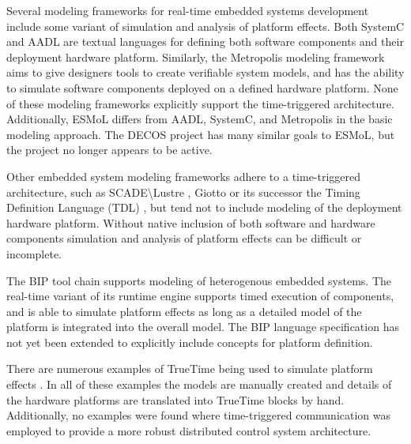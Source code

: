 Several modeling frameworks for real-time embedded systems development include some variant of simulation and analysis of platform effects.  Both SystemC \cite{grotker_02} and AADL \cite{hf_07} are textual languages for defining both software components and their deployment hardware platform.  Similarly, the Metropolis modeling framework \cite{bwhlps_03} aims to give designers tools to create verifiable system models, and has the ability to simulate software components deployed on a defined hardware platform.  None of these modeling frameworks explicitly support the time-triggered architecture.  Additionally, ESMoL differs from AADL, SystemC, and Metropolis in the basic modeling approach\cite{pkvnhhts_08}.  The DECOS project \cite{hsslhbcllss_07} has many similar goals to ESMoL, but the project no longer appears to be active.

Other embedded system modeling frameworks adhere to a time-triggered architecture, such as SCADE\textbackslash Lustre \cite{ccmstn_03}, Giotto \cite{hhk_01} or its successor the Timing Definition Language (TDL) \cite{ffpt_05}, but tend not to include modeling of the deployment hardware platform.  Without native inclusion of both software and hardware components simulation and analysis of platform effects can be difficult or incomplete.

The BIP \cite{basu_08, bbs_06} tool chain supports modeling of heterogenous embedded systems.  The real-time variant of its runtime engine supports timed execution of components, and is able to simulate platform effects as long as a detailed model of the platform is integrated into the overall model.  The BIP language specification \cite{bipUserManual} has not yet been extended to explicitly include concepts for platform definition.

There are numerous examples of TrueTime being used to simulate platform effects \cite{coh_07,vv_05}.  In all of these examples the models are manually created and details of the hardware platforms are translated into TrueTime blocks by hand.  Additionally, no examples were found where time-triggered communication was employed to provide a more robust distributed control system architecture.